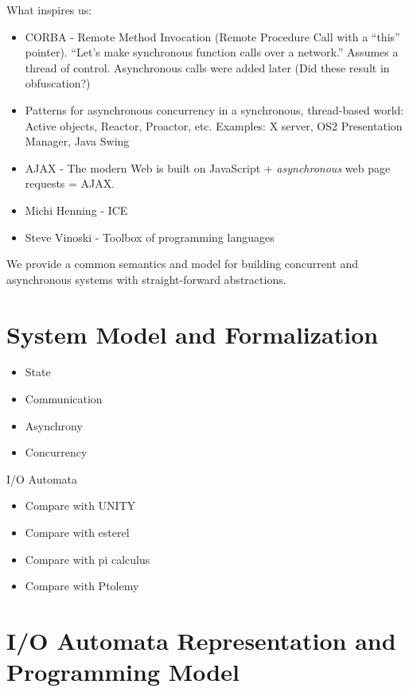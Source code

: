 \documentclass[letterpaper]{article}
\begin{document}
What inspires us:
\begin{itemize}
  \item CORBA - Remote Method Invocation (Remote Procedure Call with a ``this'' pointer).
    ``Let's make synchronous function calls over a network.''
    Assumes a thread of control.
    Asynchronous calls were added later (Did these result in obfuscation?)

  \item Patterns for asynchronous concurrency in a synchronous, thread-based world: Active objects, Reactor, Proactor, etc.
    Examples: X server, OS2 Presentation Manager, Java Swing

  \item AJAX - The modern Web is built on JavaScript + \emph{asynchronous} web page requests = AJAX.

  \item Michi Henning - ICE

  \item Steve Vinoski - Toolbox of programming languages

\end{itemize}

We provide a common semantics and model for building concurrent and asynchronous systems with straight-forward abstractions.

\section{System Model and Formalization}

\begin{itemize}
  \item State
  \item Communication
  \item Asynchrony
  \item Concurrency
\end{itemize}

I/O Automata
\begin{itemize}
  \item Compare with UNITY
  \item Compare with esterel
  \item Compare with pi calculus
  \item Compare with Ptolemy
\end{itemize}

\section{I/O Automata Representation and Programming Model\label{programming_model}}
\end{document}
